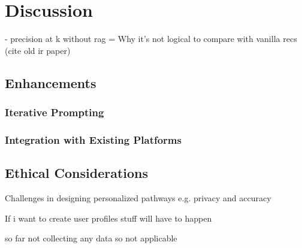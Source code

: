 \chapter{Discussion} \label{chap:chap-6}

- precision at k without rag 
= Why it's not logical to compare with vanilla recs (cite old ir paper) 


\section{Enhancements}

\subsection{Iterative Prompting}

\subsection{Integration with Existing Platforms}

\section{Ethical Considerations}

Challenges in designing personalized pathways e.g. privacy and accuracy 

If i want to create user profiles stuff will have to happen

so far not collecting any data so not applicable 